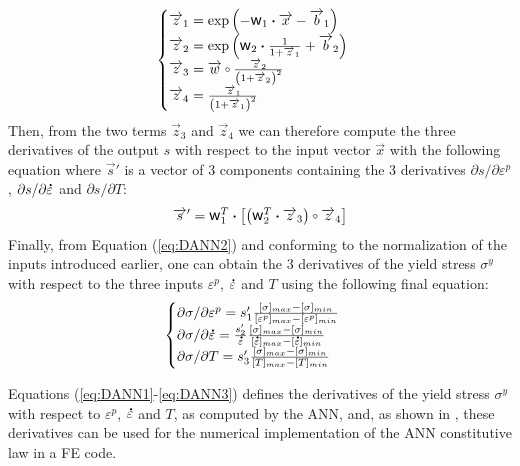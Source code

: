 \documentclass[algorithms,article,submit,pdftex,moreauthors]{Definitions/mdpi}
\DeclareRobustCommand{\w}{\mbox{\large\ensuremath{\mathsf{w}}}}
\DeclareRobustCommand{\dotp}{\boldsymbol{\cdot}}
\DeclareRobustCommand{\ccirc}{\kern0.5ex\vcenter{\hbox{$\scriptstyle\circ$}}\kern0.5ex}
\DeclareRobustCommand{\mdot}[1]{\accentset{\mbox{\bfseries .}}{#1}}
\begin{document}
\begin{equation}
\begin{cases}
\overrightarrow{z}_1 = \exp{\left(- \w_1 \dotp \overrightarrow{x}- \overrightarrow{b}_1\right)}\\
\overrightarrow{z}_2 = \exp{\left(\w_2 \dotp \frac{1}{1+\overrightarrow{z}_1} + \overrightarrow{b}_2\right)}\\
\overrightarrow{z}_3 = \overrightarrow{w} \ccirc \frac{ \overrightarrow{z}_2}{\left(1 + \overrightarrow{z}_2\right)^2}\\
\overrightarrow{z}_4 = \frac{\overrightarrow{z}_1}{\left(1+\overrightarrow{z}_1\right)^2}
\end{cases}
\label{eq:DANN1}
\end{equation}
Then, from the two terms $\overrightarrow{z}_3$ and $\overrightarrow{z}_4$ we can therefore compute the three derivatives of the output $s$ with respect to the input vector $\overrightarrow{x}$ with the following equation where $\overrightarrow{s}'$ is a vector of $3$ components containing the $3$ derivatives $\partial s/\partial\varepsilon^p$, $\partial s/\partial\mdot\varepsilon$ and $\partial s/\partial T$:
\begin{equation}
\overrightarrow{s}' = \w_1^T \dotp \left[\left(\w_2^T \dotp \overrightarrow{z}_3 \right) \ccirc \overrightarrow{z}_4\right]\label{eq:DANN2}
\end{equation}
Finally, from Equation (\ref{eq:DANN2}) and conforming to the normalization of the inputs introduced earlier, one can obtain the $3$ derivatives of the yield stress $\sigma^y$ with respect to the three inputs $\varepsilon^p$, $\mdot\varepsilon$ and $T$ using the following final equation:
\begin{equation}
\begin{cases}
\partial \sigma/\partial \varepsilon^p = s'_1 \frac{[\sigma]_{max} -[\sigma]_{min}}{[\varepsilon^p]_{max} -[\varepsilon^p]_{min}}\\
\partial \sigma/\partial\mdot\varepsilon = \frac{s'_2}{\mdot\varepsilon} \frac{[\sigma]_{max} -[\sigma]_{min}}{[\mdot\varepsilon]_{max} -[\mdot\varepsilon]_{min}} \\
\partial \sigma/\partial T = s'_3 \frac{[\sigma]_{max} -[\sigma]_{min}}{[T]_{max} -[T]_{min}}
\end{cases}
\label{eq:DANN3}
\end{equation}

Equations (\ref{eq:DANN1}-\ref{eq:DANN3}) defines the derivatives of the yield stress $\sigma^y$ with respect to $\varepsilon^p$, $\mdot\varepsilon$ and $T$, as computed by the ANN, and, as shown in \cite{Pantale-2021}, these derivatives can be used for the numerical implementation of the ANN constitutive law in a FE code.
\end{document}
